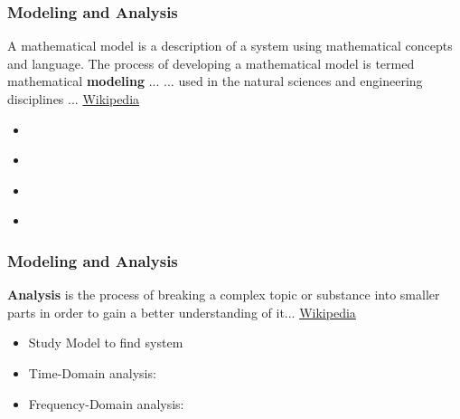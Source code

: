 \documentclass[fleqn]{beamer} %
\newcommand{\sectionIsubsectionIItitle}{Modeling and Analysis}
\begin{document}
			\begin{frame}
				\frametitle{\sectionIsubsectionIItitle}
				\bigskip

				A mathematical model is a description of a system using mathematical concepts and language. The process of developing a mathematical model is termed mathematical {\bf modeling} ... \vspc
				...  used in the natural sciences and engineering disciplines ...  \href{https://en.wikipedia.org/wiki/Mathematical_model}{\tiny Wikipedia}

				\begin{itemize}
					\item \underline{\hspace{80mm}} \vspcc
					\item \underline{\hspace{80mm}} \vspcc
					\item \underline{\hspace{80mm}} \vspcc
					\item \underline{\hspace{80mm}} \vspcc
				\end{itemize}

				\btVFill
			\end{frame}

			\begin{frame}
				\frametitle{\sectionIsubsectionIItitle}
				\bigskip

				{\bf Analysis} is the process of breaking a complex topic or substance into smaller parts in order to gain a better understanding of it... \href{https://en.wikipedia.org/wiki/Analysis}{\tiny Wikipedia}

				\begin{itemize}
					\item Study Model to find system \underline{\hspace{40mm}} \vspcc
					\item Time-Domain analysis: \underline{\hspace{80mm}}
					\item Frequency-Domain analysis:\underline{\hspace{80mm}}
				\end{itemize}
		
				\btVFill
			\end{frame}

\end{document}
